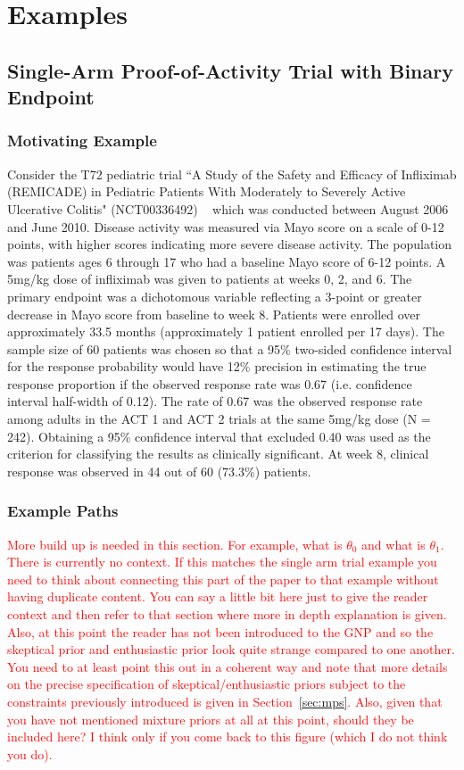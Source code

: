 \documentclass[useAMS,usenatbib,referee]{biom}
\begin{document}
\section{Examples}\label{sec:examples}

\subsection{Single-Arm Proof-of-Activity Trial with Binary Endpoint}\label{sec:example1}
\subsubsection{Motivating Example}
Consider the T72 pediatric trial ``A Study of the Safety and Efficacy of Infliximab (REMICADE) in Pediatric Patients With Moderately to Severely Active Ulcerative Colitis" (NCT00336492) ~\citep{Hyams2012} which was conducted between August 2006 and June 2010.
%
Disease activity was measured via Mayo score on a scale of 0-12 points, with higher scores indicating more severe disease activity.
%
The population was patients ages 6 through 17 who had a baseline Mayo score of 6-12 points.
%
A 5mg/kg dose of infliximab was given to patients at weeks 0, 2, and 6.
%
The primary endpoint was a dichotomous variable reflecting a 3-point or greater decrease in Mayo score from baseline to week 8. 
%
Patients were enrolled over approximately 33.5 months (approximately 1 patient enrolled per 17 days). 
%
The sample size of 60 patients was chosen so that a 95\% two-sided confidence interval for the response probability would have 12\% precision in estimating the true response proportion if the observed response rate was 0.67 (i.e. confidence interval half-width of 0.12). The rate of 0.67 was the observed response rate among adults in the ACT 1 and ACT 2 trials \citep{Rutgeerts2005} at the same 5mg/kg dose (N = 242). Obtaining a 95\% confidence interval that excluded 0.40 was used as the criterion for classifying the results as clinically significant. At week 8, clinical response was observed in 44 out of 60 (73.3\%) patients.

\subsubsection{Example Paths}
\textcolor{red}{More build up is needed in this section. For example, what is $\theta_0$ and what is $\theta_1$. There is currently no context. If this matches
the single arm trial example you need to think about connecting this part of the paper to that example without having duplicate content. You can say a little bit here just to give
the reader context and then refer to that section where more in depth explanation is given. Also, at this point the reader has not been introduced to the GNP and so the skeptical prior and enthusiastic prior look quite strange compared to one another. You need to at least point this out in a coherent way and note that more details on the precise specification of skeptical/enthusiastic priors subject to the constraints previously introduced is given in Section~\ref{sec:mps}. Also, given that you have not mentioned mixture priors at all at this point, should they be included here? I think only if you come back to this figure (which I do not think you do).
}
\end{document}
